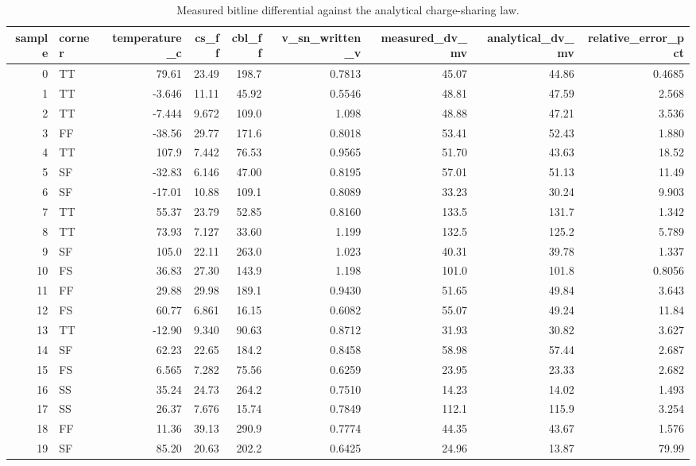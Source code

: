 \begin{table}[!t]
\centering
\caption{Measured bitline differential against the analytical charge-sharing law.}
\label{tab:validation_charge_sharing}
\footnotesize
\begin{tabular}{rlrrrrrrr}
\toprule
sample & corner & temperature\_c & cs\_ff & cbl\_ff & v\_sn\_written\_v & measured\_dv\_mv & analytical\_dv\_mv & relative\_error\_pct \\
\midrule
0 & TT & 79.61 & 23.49 & 198.7 & 0.7813 & 45.07 & 44.86 & 0.4685 \\
1 & TT & -3.646 & 11.11 & 45.92 & 0.5546 & 48.81 & 47.59 & 2.568 \\
2 & TT & -7.444 & 9.672 & 109.0 & 1.098 & 48.88 & 47.21 & 3.536 \\
3 & FF & -38.56 & 29.77 & 171.6 & 0.8018 & 53.41 & 52.43 & 1.880 \\
4 & TT & 107.9 & 7.442 & 76.53 & 0.9565 & 51.70 & 43.63 & 18.52 \\
5 & SF & -32.83 & 6.146 & 47.00 & 0.8195 & 57.01 & 51.13 & 11.49 \\
6 & SF & -17.01 & 10.88 & 109.1 & 0.8089 & 33.23 & 30.24 & 9.903 \\
7 & TT & 55.37 & 23.79 & 52.85 & 0.8160 & 133.5 & 131.7 & 1.342 \\
8 & TT & 73.93 & 7.127 & 33.60 & 1.199 & 132.5 & 125.2 & 5.789 \\
9 & SF & 105.0 & 22.11 & 263.0 & 1.023 & 40.31 & 39.78 & 1.337 \\
10 & FS & 36.83 & 27.30 & 143.9 & 1.198 & 101.0 & 101.8 & 0.8056 \\
11 & FF & 29.88 & 29.98 & 189.1 & 0.9430 & 51.65 & 49.84 & 3.643 \\
12 & FS & 60.77 & 6.861 & 16.15 & 0.6082 & 55.07 & 49.24 & 11.84 \\
13 & TT & -12.90 & 9.340 & 90.63 & 0.8712 & 31.93 & 30.82 & 3.627 \\
14 & SF & 62.23 & 22.65 & 184.2 & 0.8458 & 58.98 & 57.44 & 2.687 \\
15 & FS & 6.565 & 7.282 & 75.56 & 0.6259 & 23.95 & 23.33 & 2.682 \\
16 & SS & 35.24 & 24.73 & 264.2 & 0.7510 & 14.23 & 14.02 & 1.493 \\
17 & SS & 26.37 & 7.676 & 15.74 & 0.7849 & 112.1 & 115.9 & 3.254 \\
18 & FF & 11.36 & 39.13 & 290.9 & 0.7774 & 44.35 & 43.67 & 1.576 \\
19 & SF & 85.20 & 20.63 & 202.2 & 0.6425 & 24.96 & 13.87 & 79.99 \\

\end{tabular}
\end{table}
